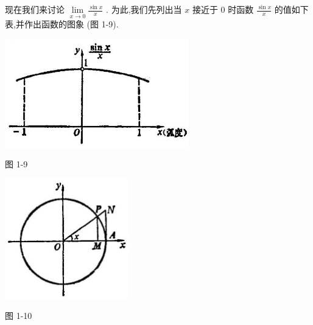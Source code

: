 \documentclass[lang=cn,newtx,10pt,scheme=chinese]{elegantbook}
\begin{document}
现在我们来讨论 \(\mathop{\lim }\limits_{{x \rightarrow 0}}\frac{\sin x}{x}\) . 为此,我们先列出当 \(x\) 接近于 0 时函数 \(\frac{\sin x}{x}\) 的值如下表,并作出函数的图象 (图 1-9).

\begin{center}
\end{center}

\begin{center}
	\includegraphics[max width=0.6\textwidth]{images/01912c18-5c3f-733d-b775-749ba9897a9d_42_483969.jpg}
\end{center}

图 1-9

\begin{center}
	\includegraphics[max width=0.4\textwidth]{images/01912c18-5c3f-733d-b775-749ba9897a9d_42_838953.jpg}
\end{center}

图 1-10
\end{document}
